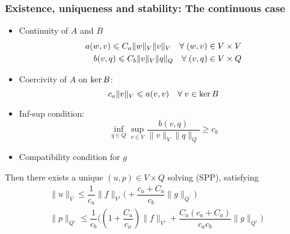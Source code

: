 \begin{frame}[shrink=5]
  \frametitle{Existence, uniqueness and stability: The continuous case}
  \begin{itemize}
    \item Continuity of $A$ and $B$
      \begin{align*}
        a(w,v) \leqslant C_a \| w \|_V \|v\|_V \quad \forall \; (w,v) \in
        V \times V 
        \\
        b(v,q) \leqslant C_b \| v \|_V \|q\|_Q \quad \forall \; (v,q) \in
        V \times Q
      \end{align*}
 \item Coercivity of $A$ on $\operatorname{ker} B$:
 \[
   c_a \| v \|_V \leqslant a(v,v) \quad \forall \; v \in \operatorname{ker} B 
 \]
 \item Inf-sup condition:
 \[
   \inf_{q \in Q} \sup_{v\in V} \dfrac{b(v,q)}{\|v\|_V \|q\|_Q}
   \geqslant c_b
 \]
 \item Compatibility condition for $g$
  \end{itemize}
  Then there exists a unique $(u,p) \in V\times Q$ solving
  (SPP), satisfying
  \begin{gather*}
    \| u \|_V \leqslant \dfrac{1}{c_a} 
    \| f \|_{V'} 
    \bigl(
    + \dfrac{c_a + C_a}{c_b} \|g\|_{Q^{\prime}}
    \bigr)
    \\
    \| p \|_{Q'} \leqslant \dfrac{1}{c_b}
    \bigl(
    (1 + \dfrac{C_a}{c_a}) \| f \|_{V'}
    +
    \dfrac{C_a(c_a + C_a)}{c_a c_b} \| g \|_{Q'}
    \bigr)
  \end{gather*}
\end{frame}

